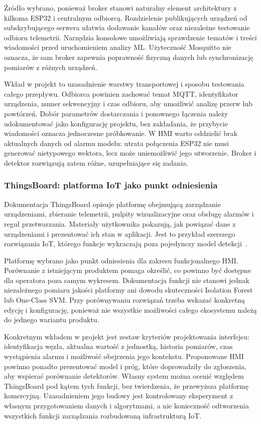\documentclass[12pt,a4paper]{article}
\begin{document}
Źródło wybrano, ponieważ broker stanowi naturalny element architektury
z kilkoma ESP32 i centralnym odbiorcą. Rozdzielenie publikujących urządzeń
od subskrybującego serwera ułatwia dodawanie kanałów oraz niezależne
testowanie odbioru telemetrii. Narzędzia konsolowe umożliwiają sprawdzenie
tematów i treści wiadomości przed uruchomieniem analizy ML. Użyteczność
Mosquitto nie oznacza, że sam broker zapewnia poprawność fizyczną danych
lub synchronizację pomiarów z różnych urządzeń.

Wkład w projekt to uzasadnienie warstwy transportowej i sposobu testowania
całego przepływu. Odbiorca powinien zachować temat MQTT, identyfikator
urządzenia, numer sekwencyjny i czas odbioru, aby umożliwić analizę przerw
lub powtórzeń. Dobór parametrów dostarczania i ponownego łączenia należy
udokumentować jako konfigurację projektu, bez zakładania, że przybycie
wiadomości oznacza jednoczesne próbkowanie. W HMI warto oddzielić brak
aktualnych danych od alarmu modelu: utrata połączenia ESP32 nie musi
generować nietypowego wektora, lecz może uniemożliwić jego utworzenie.
Broker i detektor rozwiązują zatem różne, uzupełniające się zadania.

\subsubsection{ThingsBoard: platforma IoT jako punkt odniesienia}
Dokumentacja ThingsBoard opisuje platformę obejmującą zarządzanie
urządzeniami, zbieranie telemetrii, pulpity wizualizacyjne oraz obsługę
alarmów i reguł przetwarzania. Materiały użytkownika pokazują, jak
powiązać dane z urządzeniami i prezentować ich stan w aplikacji.
Jest to przykład szerszego rozwiązania IoT, którego funkcje wykraczają
poza pojedynczy model detekcji~\cite{thingsboard_docs}.

Platformę wybrano jako punkt odniesienia dla zakresu funkcjonalnego HMI.
Porównanie z istniejącym produktem pomaga określić, co powinno być
dostępne dla operatora poza samym wykresem. Dokumentacja funkcji nie
stanowi jednak niezależnego pomiaru jakości platformy ani dowodu
skuteczności Isolation Forest lub One-Class SVM. Przy porównywaniu
rozwiązań trzeba wskazać konkretną edycję i konfigurację, ponieważ nie
wszystkie możliwości całego ekosystemu należą do jednego wariantu produktu.

Konkretnym wkładem w projekt jest zestaw kryteriów projektowania interfejsu:
identyfikacja węzła, aktualna wartość z jednostką, historia pomiarów,
czas wystąpienia alarmu i możliwość obejrzenia jego kontekstu.
Proponowane HMI powinno ponadto prezentować model i próg, które doprowadziły
do zgłoszenia, aby wspierać porównanie detektorów. Własny system można
ocenić względem ThingsBoard pod kątem tych funkcji, bez twierdzenia,
że przewyższa platformę komercyjną. Uzasadnieniem jego budowy jest
kontrolowany eksperyment z własnym przygotowaniem danych i algorytmami,
a nie konieczność odtworzenia wszystkich funkcji zarządzania
rozbudowaną infrastrukturą IoT.
\end{document}
